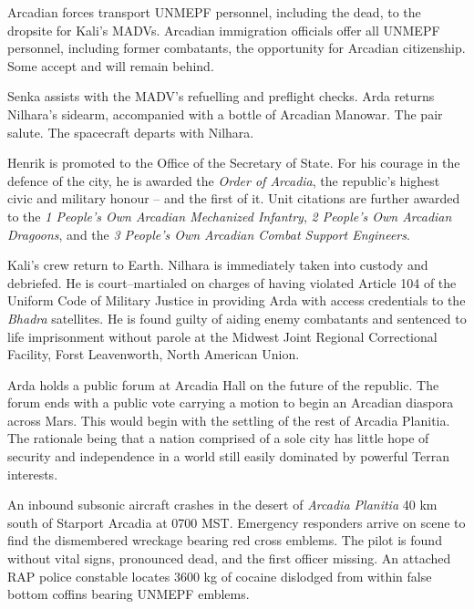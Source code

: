 Arcadian forces transport UNMEPF personnel, including the dead, to the dropsite for Kali's MADVs. Arcadian immigration officials offer all UNMEPF personnel, including former combatants, the opportunity for Arcadian citizenship. Some accept and will remain behind. 

Senka assists with the MADV's refuelling and preflight checks. Arda returns Nilhara's sidearm, accompanied with a bottle of Arcadian Manowar. The pair salute. The spacecraft departs with Nilhara.
\StopTimelineDate

Henrik is promoted to the Office of the Secretary of State. For his courage in the defence of the city, he is awarded the {\it Order of Arcadia}, the republic's highest civic and military honour -- and the first of it. Unit citations are further awarded to the {\it 1 People's Own Arcadian Mechanized Infantry}, {\it 2 People's Own Arcadian Dragoons}, and the {\it 3 People's Own Arcadian Combat Support Engineers}.
\StopTimelineDate

Kali's crew return to Earth. Nilhara is immediately taken into custody and debriefed. He is court--martialed on charges of having violated Article 104 of the Uniform Code of Military Justice in providing Arda with access credentials to the {\it Bhadra} satellites. He is found guilty of aiding enemy combatants and sentenced to life imprisonment without parole at the Midwest Joint Regional Correctional Facility, Forst Leavenworth, North American Union.
\StopTimelineDate

Arda holds a public forum at Arcadia Hall on the future of the republic. The forum ends with a public vote carrying a motion to begin an Arcadian diaspora across Mars. This would begin with the settling of the rest of Arcadia Planitia. The rationale being that a nation comprised of a sole city has little hope of security and independence in a world still easily dominated by powerful Terran interests.
\StopTimelineDate

An inbound subsonic aircraft crashes in the desert of {\it Arcadia Planitia} 40 km south of Starport Arcadia at 0700 MST. Emergency responders arrive on scene to find the dismembered wreckage bearing red cross emblems. The pilot is found without vital signs, pronounced dead, and the first officer missing. An attached RAP police constable locates 3600 kg of cocaine dislodged from within false bottom coffins bearing UNMEPF emblems.

